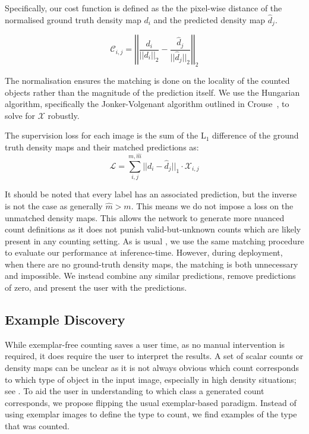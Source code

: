 \documentclass[runningheads]{llncs}
\begin{document}
Specifically, our cost function is defined as the the pixel-wise distance of the normalised ground truth density map $d_i$ and the predicted density map $\hat{d}_j$. 

\begin{equation} \label{eq:MAE_cost}
\mathcal{C}_{i,j} = \left|\left| \frac{d_i}{||d_i||_2} -  \frac{\hat{d}_j}{||\hat{d}_j||_2} \right|\right|_2 
\end{equation}

The normalisation ensures the matching is done on the locality of the counted objects rather than the magnitude of the prediction itself.
We use the Hungarian algorithm, specifically the Jonker-Volgenant algorithm outlined in Crouse~\cite{Crouse2016hungarianmatching}, to solve for $\mathcal{X}$ robustly.

The supervision loss for each image is the sum of the L$_1$ difference of  the ground truth density maps and their matched predictions as:
\begin{equation} \label{eq:total_loss}
\mathcal{L} = \sum_{i,j}^{m,\hat{m}}||d_i - \hat{d}_j||_1 \cdot \mathcal{X}_{i,j}
\end{equation}

It should be noted that every label has an associated prediction, but the inverse is not the case as generally $\hat{m} > m$.
This means we do not impose a loss on the unmatched density maps.
This allows the network to generate more nuanced count definitions as it does not punish valid-but-unknown counts which are likely present in any counting setting.
As is usual \cite{troisemaine2023novel, 5454426,pmlr-v48-xieb16}, we use the same matching procedure to evaluate our performance at inference-time. However, during deployment, when there are no ground-truth density maps, the matching is both unnecessary and impossible. We instead combine any similar predictions, remove predictions of zero, and present the user with the predictions.

\subsection{Example Discovery}
While exemplar-free counting saves a user time, as no manual intervention is required, it does require the user to interpret the results. A set of scalar counts or density maps can be unclear as it is not always obvious which count corresponds to which type of object in the input image, especially in high density situations; see .
To aid the user in understanding to which class a generated count corresponds, we propose flipping the usual exemplar-based paradigm.
Instead of using exemplar images to define the type to count, we find examples of the type that was counted. 
\end{document}
